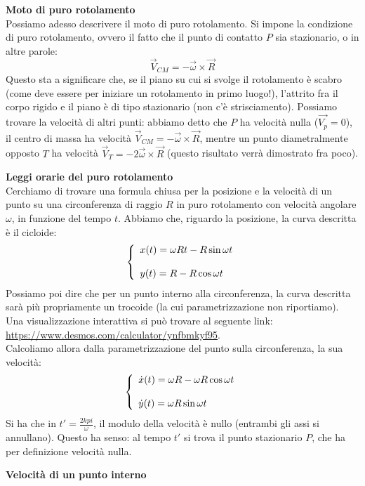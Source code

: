 \documentclass[a4paper,12pt]{article}
\begin{document}
\par\smallskip
\textbf{Moto di puro rotolamento} \\
Possiamo adesso descrivere il moto di puro rotolamento. Si impone la condizione di puro rotolamento, ovvero il fatto che il punto di contatto $P$ sia stazionario, o in altre parole:
$$ \vec{V}_{CM} = -\vec{\omega} \times \vec{R} $$
Questo sta a significare che, se il piano su cui si svolge il rotolamento è scabro (come deve essere per iniziare un rotolamento in primo luogo!), l'attrito fra il corpo rigido e il piano è di tipo stazionario (non c'è strisciamento).
Possiamo trovare la velocità di altri punti: abbiamo detto che $P$ ha velocità nulla ($\vec{V_p}=0$), il centro di massa ha velocità $\vec{V}_{CM} = -\vec{\omega} \times \vec{R}$, mentre un punto diametralmente opposto $T$ ha velocità $\vec{V}_T = -2\vec{\omega} \times \vec{R}$ (questo risultato verrà
dimostrato fra poco).
\par\smallskip
\textbf{Leggi orarie del puro rotolamento} \\
Cerchiamo di trovare una formula chiusa per la posizione e la velocità di un punto su una circonferenza di raggio $R$ in puro rotolamento con velocità angolare $\omega$, in funzione del tempo $t$. Abbiamo che, riguardo la posizione,
la curva descritta è il cicloide:
$$ 
\left\{\begin{array}{l}
    x(t) = \omega R t - R\sin{\omega t} \cr \\
    y(t) = R - R\cos{\omega t}
\end{array}\right.
$$
Possiamo poi dire che per un punto interno alla circonferenza, la curva descritta sarà più propriamente un trocoide (la cui parametrizzazione non riportiamo). Una visualizzazione interattiva si può trovare al seguente link:
\url{https://www.desmos.com/calculator/ynfbmkyf95}. \\
Calcoliamo allora dalla parametrizzazione del punto sulla circonferenza, la sua velocità:
$$ 
\left\{\begin{array}{l}
    \dot{x}(t) = \omega R - \omega R \cos{\omega t} \cr \\ 
    \dot{y}(t) = \omega R \sin{\omega t}
\end{array}\right.
$$
Si ha che in $t' = \frac{2kpi}{\omega}$, il modulo della velocità è nullo (entrambi gli assi si annullano). Questo ha senso: al tempo $t'$ si trova il punto stazionario $P$, che ha per definizione velocità nulla.
\par\smallskip
\textbf{Velocità di un punto interno} \\
\end{document}
